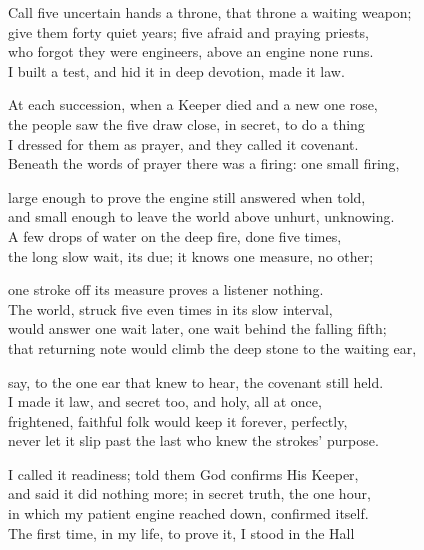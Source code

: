 \begin{founder}
Call five uncertain hands a throne, that throne a waiting weapon;\\
give them forty quiet years; five afraid and praying priests,\\
who forgot they were engineers, above an engine none runs.\\
I built a test, and hid it in deep devotion, made it law.\\
\medskip

At each succession, when a Keeper died and a new one rose,\\
the people saw the five draw close, in secret, to do a thing\\
I dressed for them as prayer, and they called it covenant.\\
Beneath the words of prayer there was a firing: one small firing,\\
\medskip

large enough to prove the engine still answered when told,\\
and small enough to leave the world above unhurt, unknowing.\\
A few drops of water on the deep fire, done five times,\\
the long slow wait, its due; it knows one measure, no other;\\
\medskip

one stroke off its measure proves a listener nothing.\\
The world, struck five even times in its slow interval,\\
would answer one wait later, one wait behind the falling fifth;\\
that returning note would climb the deep stone to the waiting ear,\\
\medskip

say, to the one ear that knew to hear, the covenant still held.\\
I made it law, and secret too, and holy, all at once,\\
frightened, faithful folk would keep it forever, perfectly,\\
never let it slip past the last who knew the strokes' purpose.\\
\medskip

I called it readiness; told them God confirms His Keeper,\\
and said it did nothing more; in secret truth, the one hour,\\
in which my patient engine reached down, confirmed itself.\\
The first time, in my life, to prove it, I stood in the Hall\\
\medskip


\end{founder}
